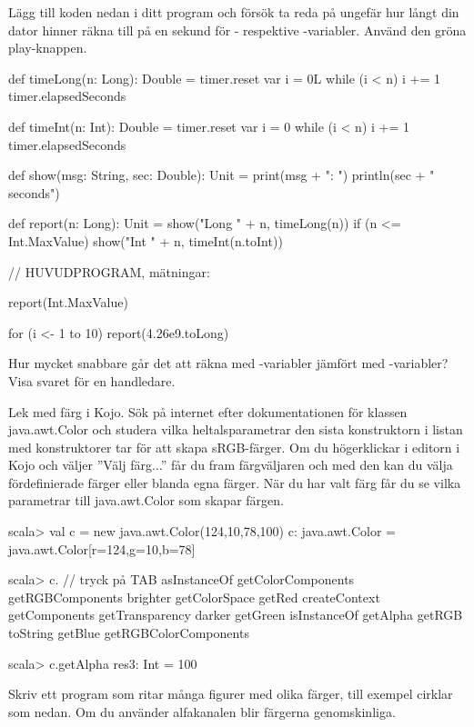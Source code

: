 \Subtask Lägg till koden nedan i ditt program och försök ta reda på ungefär hur långt din dator hinner räkna till på en sekund för - respektive -variabler. Använd den gröna play-knappen.
\begin{Code}
def timeLong(n: Long): Double = {
  timer.reset
  var i = 0L
  while (i < n) { i += 1 }
  timer.elapsedSeconds
}

def timeInt(n: Int): Double = {
  timer.reset
  var i = 0
  while (i < n) { i += 1 }
  timer.elapsedSeconds
}

def show(msg: String, sec: Double): Unit = {
  print(msg + ": ")
  println(sec + " seconds")
}

def report(n: Long): Unit = {
  show("Long " + n, timeLong(n))
  if (n <= Int.MaxValue) show("Int  " + n, timeInt(n.toInt))
}

// HUVUDPROGRAM, mätningar:

report(Int.MaxValue)

for (i <- 1 to 10) {
  report(4.26e9.toLong)
}
\end{Code}

\Subtask\Checkpoint Hur mycket snabbare går det att räkna med -variabler jämfört med -variabler? Visa svaret för en handledare.

\Task Lek med färg i Kojo. Sök på internet efter dokumentationen för klassen java.awt.Color och studera vilka heltalsparametrar den sista konstruktorn i listan med konstruktorer tar för att skapa sRGB-färger. Om du högerklickar i editorn i Kojo och väljer ''Välj färg...'' får du fram färgväljaren och med den kan du välja fördefinierade färger eller blanda egna färger. När du har valt färg får du se vilka parametrar till java.awt.Color som skapar färgen. 

\begin{REPL}
scala> val c = new java.awt.Color(124,10,78,100)
c: java.awt.Color = java.awt.Color[r=124,g=10,b=78]

scala> c.  // tryck på TAB
asInstanceOf    getColorComponents      getRGBComponents
brighter        getColorSpace           getRed
createContext   getComponents           getTransparency
darker          getGreen                isInstanceOf
getAlpha        getRGB                  toString
getBlue         getRGBColorComponents

scala> c.getAlpha
res3: Int = 100
\end{REPL}
Skriv ett program som ritar många figurer med olika färger, till exempel cirklar som nedan. Om du använder alfakanalen blir färgerna genomskinliga.
 
